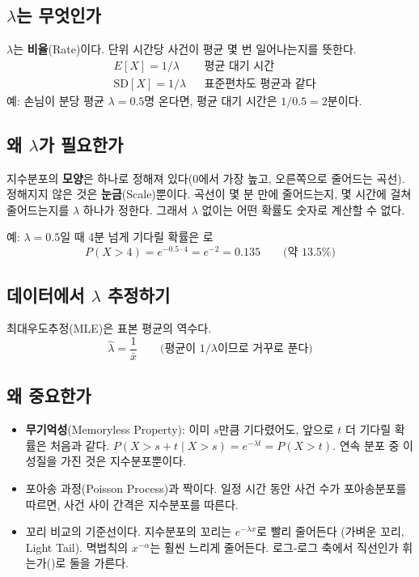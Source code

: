 \documentclass[11pt]{article}
\newcommand{\term}[1]{\textbf{#1}}
\begin{document}
\subsection{$\lambda$는 무엇인가}
$\lambda$는 \term{비율}(Rate)이다. 단위 시간당 사건이 평균 몇 번 일어나는지를 뜻한다.
\begin{align*}
  &E[X] = 1/\lambda         && \text{평균 대기 시간}\\
  &\mathrm{SD}[X] = 1/\lambda && \text{표준편차도 평균과 같다}
\end{align*}
예: 손님이 분당 평균 $\lambda = 0.5$명 온다면, 평균 대기 시간은 $1/0.5 = 2$분이다.

\subsection{왜 $\lambda$가 필요한가}
지수분포의 \term{모양}은 하나로 정해져 있다(0에서 가장 높고, 오른쪽으로 줄어드는 곡선).
정해지지 않은 것은 \term{눈금}(Scale)뿐이다. 곡선이 몇 분 만에 줄어드는지, 몇 시간에
걸쳐 줄어드는지를 $\lambda$ 하나가 정한다. 그래서 $\lambda$ 없이는 어떤 확률도
숫자로 계산할 수 없다.

예: $\lambda = 0.5$일 때 4분 넘게 기다릴 확률은 로
\[
  P(X > 4) = e^{-0.5 \cdot 4} = e^{-2} = 0.135
  \qquad \text{(약 13.5\%)}
\]

\subsection{데이터에서 $\lambda$ 추정하기}
최대우도추정(MLE)은 표본 평균의 역수다.
\[
  \hat\lambda = \frac{1}{\bar x}
  \qquad \text{(평균이 $1/\lambda$이므로 거꾸로 푼다)}
\]

\subsection{왜 중요한가}
\begin{itemize}
  \item \term{무기억성}(Memoryless Property): 이미 $s$만큼 기다렸어도, 앞으로 $t$ 더
        기다릴 확률은 처음과 같다.
        $P(X > s + t \mid X > s) = e^{-\lambda t} = P(X > t)$.
        연속 분포 중 이 성질을 가진 것은 지수분포뿐이다.
  \item 포아송 과정(Poisson Process)과 짝이다. 일정 시간 동안 사건 수가 포아송분포를
        따르면, 사건 사이 간격은 지수분포를 따른다.
  \item 꼬리 비교의 기준선이다. 지수분포의 꼬리는 $e^{-\lambda x}$로 빨리 줄어든다
        (가벼운 꼬리, Light Tail). 멱법칙의 $x^{-\alpha}$는 훨씬 느리게 줄어든다.
        로그-로그 축에서 직선인가 휘는가()로 둘을 가른다.
\end{itemize}
\end{document}
